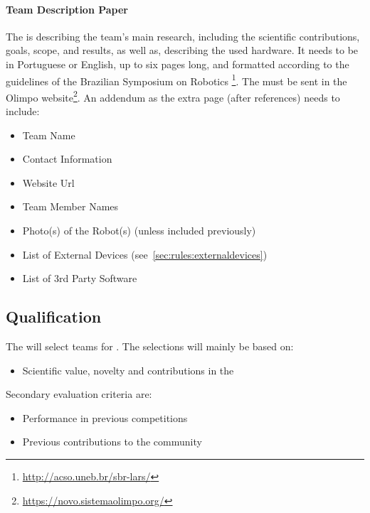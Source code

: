\paragraph{Team Description Paper}
\label{sec:rules:application:tdp}
The \TDP{} is describing the team's main research, including the scientific contributions, goals, scope, and results, as well as, describing the used hardware. It needs to be in Portuguese or English, up to six pages long, and formatted according to the guidelines of the Brazilian Symposium on Robotics \footnote{\url{http://acso.uneb.br/sbr-lars/}}. 
The \TDP{} must be sent in the Olimpo website\footnote{\url{https://novo.sistemaolimpo.org/}}.
An addendum as the extra page (after references) needs to include:
\begin{itemize}
	\item Team Name
	\item Contact Information
	\item Website Url
	\item Team Member Names
	\item Photo(s) of the Robot(s) (unless included previously) 
	\item List of External Devices (see~\ref{sec:rules:externaldevices})
	\item List of 3rd Party Software
\end{itemize}

\subsection{Qualification}
\label{sec:rules:qualification}
The \OC{} will select teams for \Qualification{}. The selections will mainly be based on:
\begin{itemize}
	\item Scientific value, novelty and contributions in the \TDP{}

\end{itemize}
Secondary evaluation criteria are:
\begin{itemize}
	\item Performance in previous competitions
	\item Previous contributions to the \AtHome{} community
\end{itemize}


